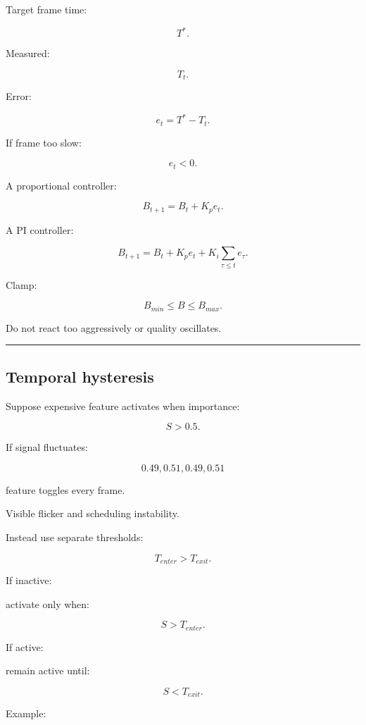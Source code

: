 \hypertarget{04-visual-computing-ii-ch040-online-controller}{}

Target frame time:

\[
T^*.
\]

Measured:

\[
T_t.
\]

Error:

\[
e_t=
T^*-T_t.
\]

If frame too slow:

\[
e_t<0.
\]

A proportional controller:

\[
B_{t+1}
=
B_t
+
K_p e_t.
\]

A PI controller:

\[
\boxed{
B_{t+1}
=
B_t
+
K_p e_t
+
K_i\sum_{\tau\le t}e_\tau.
}
\]

Clamp:

\[
B_{min}\le B\le B_{max}.
\]

Do not react too aggressively or quality oscillates.

\begin{center}\rule{0.5\linewidth}{0.5pt}\end{center}

\subsection{Temporal hysteresis}\label{04-visual-computing-ii-ch040-temporal-hysteresis}

\hypertarget{04-visual-computing-ii-ch040-temporal-hysteresis}{}

Suppose expensive feature activates when importance:

\[
S>0.5.
\]

If signal fluctuates:

\[
0.49,0.51,0.49,0.51
\]

feature toggles every frame.

Visible flicker and scheduling instability.

Instead use separate thresholds:

\[
\boxed{
T_{enter}>T_{exit}.
}
\]

If inactive:

activate only when:

\[
S>T_{enter}.
\]

If active:

remain active until:

\[
S<T_{exit}.
\]

Example:

